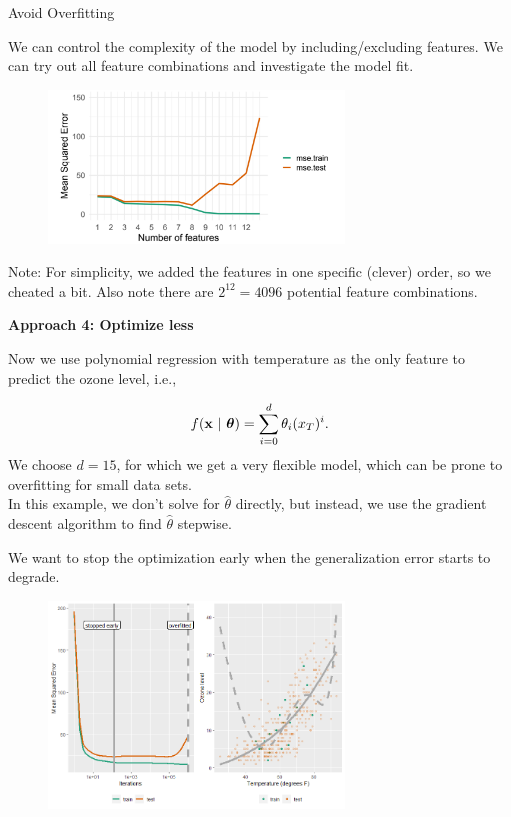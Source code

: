 \begin{vbframe}{Avoid Overfitting}
\framebreak

We can control the complexity of the model by including/excluding features.
We can try out all feature combinations and investigate the model fit.


\begin{figure}
\includegraphics[width=0.7\textwidth]{figure_man/avoid-overfitting02.png}\\
\end{figure}

\vfill

\begin{footnotesize}
Note: For simplicity, we added the features in one specific (clever) order, so we cheated a bit. Also note there are $2^{12} = 4096$ potential feature combinations.
\end{footnotesize}

\framebreak

\textbf{Approach 4: Optimize less}

\lz

Now we use polynomial regression with temperature as the only feature to predict the ozone level, i.e.,

$$f(\mathbf{x} ~|~ \bm{\theta}) = \sum^{d}_{i=0} \theta_i (x_T)^{i} .$$
We choose $d = 15$, for which we get a very flexible model, which can be prone to overfitting for small data sets. \\
\medskip
In this example, we don't solve for $\hat\theta$ directly, but instead, we use the gradient descent algorithm to find $\hat\theta$ stepwise.

\framebreak

We want to stop the optimization early when the generalization error starts to degrade.


\begin{figure}
\includegraphics[width=0.7\textwidth]{figure_man/mean-squ-error.png}\\
\end{figure}


\end{vbframe}
